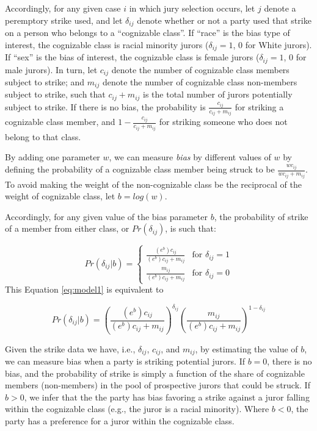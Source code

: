 \documentclass[12pt]{article}
\begin{document}
Accordingly, for any given case \(i\) in which jury selection occurs, let \(j\) denote a peremptory strike used, and let \(\delta_{ij}\) denote whether or not a party used that strike on a person who belongs to a ``cognizable class''. If ``race'' is the bias type of interest, the cognizable class is racial minority jurors (\(\delta_{ij} =1\), 0 for White jurors). If ``sex'' is the bias of interest, the cognizable class is female jurors (\(\delta_{ij} = 1\), 0 for male jurors). In turn, let \(c_{ij}\) denote the number of cognizable class members subject to strike; and \(m_{ij}\) denote the number of cognizable class non-members subject to strike, such that \(c_{ij}+m_{ij}\) is the total number of jurors potentially subject to strike. If there is no bias, the probability is \(\frac{c_{ij}}{c_{ij}+m_{ij}}\) for striking a cognizable class member, and \(1-\frac{c_{ij}}{c_{ij}+m_{ij}}\) for striking someone who does not belong to that class.

By adding one parameter \(w\), we can measure \emph{bias} by different values of \(w\) by defining the probability of a cognizable class member being struck to be \(\frac{wc_{ij}}{wc_{ij}+m_{ij}}\). To avoid making the weight of the non-cognizable class be the reciprocal of the weight of cognizable class, let \(b = log(w)\).

Accordingly, for any given value of the bias parameter \(b\), the probability of strike of a member from either class, or \(Pr(\delta_{ij})\), is such that:

\begin{equation}
Pr(\delta_{ij} | b) = 
\begin{cases}
  \frac{(e^b)c_{ij}}{(e^b)c_{ij}+m_{ij}} & \text{for }\delta_{ij}=1\\    
  \frac{m_{ij}}{(e^b)c_{ij}+m_{ij}} & \text{for }\delta_{ij}=0  \label{eq:model1}
\end{cases} 
\end{equation} This Equation \eqref{eq:model1} is equivalent to

\begin{equation}
Pr(\delta_{ij}| b) = \left(\frac{(e^b)c_{ij}}{(e^b)c_{ij}+m_{ij}}\right)^{\delta_{ij}} \left(\frac{m_{ij}}{(e^b)c_{ij}+m_{ij}}\right)^{1-\delta_{ij}}
\label{eq:model2}
\end{equation}

Given the strike data we have, i.e., \(\delta_{ij}\), \(c_{ij}\), and \(m_{ij}\), by estimating the value of \(b\), we can measure bias when a party is striking potential jurors. If \(b = 0\), there is no bias, and the probability of strike is simply a function of the share of cognizable members (non-members) in the pool of prospective jurors that could be struck. If \(b>0\), we infer that the the party has bias favoring a strike against a juror falling within the cognizable class (e.g., the juror is a racial minority). Where \(b<0\), the party has a preference for a juror within the cognizable class.
\end{document}
